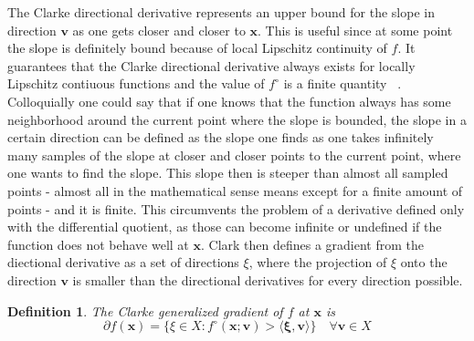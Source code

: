 \documentclass[a4paper,10pt]{article}
\newtheorem{definition}{Definition}
\renewcommand{\vec}[1]{\mathbf{#1}}
\begin{document}
    The Clarke directional derivative represents an upper bound for the
    slope in direction $\vec{v}$ as one gets closer and closer to $\vec{x}$.
    This is useful since at some point the slope is definitely bound
    because of local Lipschitz continuity of $f$.
    It guarantees that the Clarke directional derivative always exists
    for locally Lipschitz contiuous functions and the value of $f^{\circ}$
    is a finite quantity ~\cite{clarke}.
    Colloquially one could say that if one knows that the function always
    has some neighborhood around the current point where the slope is bounded,
    the slope in a certain direction can be defined as the slope
    one finds as one takes infinitely many samples of the slope at
    closer and closer points to the current point, where one wants
    to find the slope.
    This slope then is steeper than almost all sampled points - almost
    all in the mathematical sense means except for a finite amount of
    points - and it is finite.
    This circumvents the problem of a derivative defined only with
    the differential quotient, as those can become infinite or
    undefined if the function does not behave well at $\vec{x}$.
    Clark then defines a gradient from the diectional derivative as
    a set of directions $\xi$, where the projection of $\xi$ onto
    the direction $\vec{v}$ is smaller than the directional
    derivatives for every direction possible.
    
    \begin{definition}
        The Clarke generalized gradient of $f$ at $\vec{x}$ is
        \begin{equation}
            \partial f(\vec{x}) = 
            \{\xi \in X : f^{\circ}(\vec{x}; \vec{v}) >
             \langle \vec{\xi}, \vec{v} \rangle\}
             \quad \forall \vec{v} \in X
        \end{equation}
    \end{definition}
\end{document}
